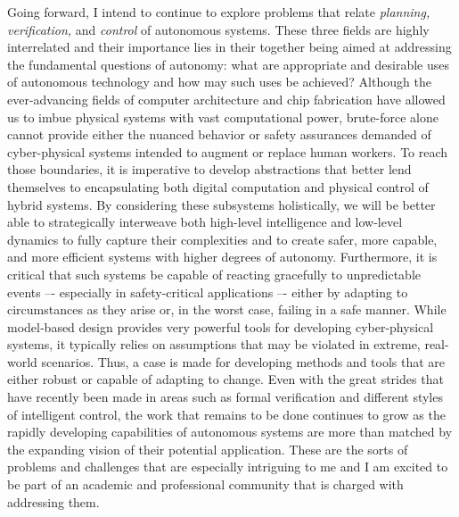 \documentclass[11pt]{letter}
\begin{document}
Going forward, I intend to continue to explore problems that relate \emph{planning, verification,} and \emph{control} of autonomous systems.  These three fields are highly interrelated and their importance lies in their together being aimed at addressing the fundamental questions of autonomy:  what are appropriate and desirable uses of autonomous technology and how may such uses be achieved?  Although the ever-advancing fields of computer architecture and chip fabrication have allowed us to imbue physical systems with vast computational power, brute-force alone cannot provide either the nuanced behavior or safety assurances demanded of cyber-physical systems intended to augment or replace human workers. To reach those boundaries, it is imperative to develop abstractions that better lend themselves to encapsulating both digital computation and physical control of hybrid systems.  By considering these subsystems holistically, we will be better able to strategically interweave both high-level intelligence and low-level dynamics to fully capture their complexities and to create safer, more capable, and more efficient systems with higher degrees of autonomy.  Furthermore, it is critical that such systems be capable of reacting gracefully to unpredictable events –- especially in safety-critical applications –- either by adapting to circumstances as they arise or, in the worst case, failing in a safe manner.  While model‑based design provides very powerful tools for developing cyber-physical systems, it typically relies on assumptions that may be violated in extreme, real-world scenarios. Thus, a case is made for developing methods and tools that are either robust or capable of adapting to change. Even with the great strides that have recently been made in areas such as formal verification and different styles of intelligent control, the work that remains to be done continues to grow as the rapidly developing capabilities of autonomous systems are more than matched by the expanding vision of their potential application.  These are the sorts of problems and challenges that are especially intriguing to me and I am excited to be part of an academic and professional community that is charged with addressing them.
\end{document}
